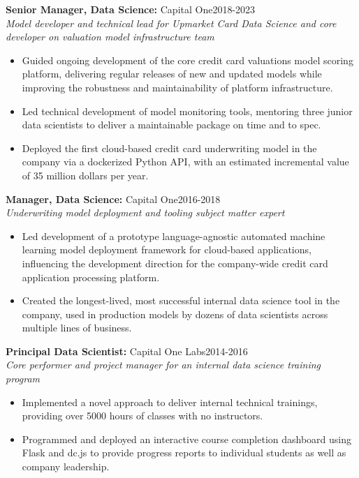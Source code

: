 \documentclass[11pt]{res}
\begin{document}
\begin{resume}
{\bf Senior Manager, Data Science:} Capital One\hfill\mbox{2018-2023}\\
{\it Model developer and technical lead for Upmarket Card Data Science and core developer on valuation model infrastructure team}
\vspace*{0.01 in}\begin{itemize} \itemsep -2pt
  \item Guided ongoing development of the core credit card valuations model scoring platform, delivering regular releases of new and updated models while improving the robustness and maintainability of platform infrastructure. 
  \item Led technical development of model monitoring tools, mentoring three junior data scientists to deliver a maintainable package on time and to spec.
  \item Deployed the first cloud-based credit card underwriting model
    in the company via a dockerized Python API, with an estimated
    incremental value of 35 million dollars per year.
\end{itemize}

{\bf Manager, Data Science:} Capital One\hfill\mbox{2016-2018}\\
{\it Underwriting model deployment and tooling subject matter expert}
\vspace*{0.01 in}\begin{itemize} \itemsep -2pt
  \item Led development of a prototype language-agnostic automated machine learning model
    deployment framework for cloud-based applications, influencing the
    development direction for the company-wide credit card application
    processing platform.
  \item Created the longest-lived, most successful
    internal data science tool in the company, used in production models by dozens of
    data scientists across multiple lines of business.
\end{itemize}

{\bf Principal Data Scientist:} Capital One Labs\hfill\mbox{2014-2016}\\
{\it Core performer and project manager for an internal data science training program}
\vspace*{0.01 in}\begin{itemize} \itemsep -2pt 
  \item Implemented a novel approach to deliver internal technical
    trainings, providing over 5000 hours of classes with no instructors.
  \item Programmed and deployed an interactive course completion dashboard using Flask
    and dc.js to provide progress reports to individual students as
    well as company leadership.
  \end{itemize}


\end{resume}
\end{document}
